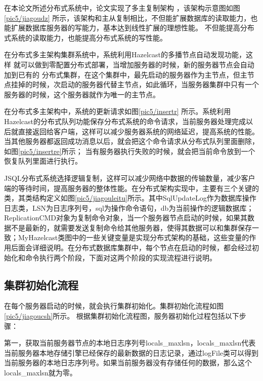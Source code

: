 在本论文所述分布式系统中，论文实现了多主复制架构
，该架构示意图如图\ref{pic5/jiagoudz}
所示，该架构和主从复制相比，不但能扩展数据库的读取能力，也能扩展数据库服务器的写能力，基本达到线性扩展的理想性能。
不但能提高分布式系统的读取能力，也能提高分布式系统的写性能。

在分布式多主架构集群系统中，系统利用Hazelcast的多播节点自动发现功能，这样
就可以做到零配置分布式部署，当增加服务器的时候，新的服务器节点会自动加到已有的
分布式集群，在这个集群中，最先启动的服务器作为主节点，但主节点挂掉的时候，次启动的服务器代替主节点，如此循环，当服务器集群中只有一个服务器的时候，这个服务器就作为唯一的主节点。

在分布式多主架构中，系统的更新请求如图\ref{pic5/insertr}
所示。系统利用Hazelcast的分布式队列功能保存分布式系统的命令请求，当前服务器处理完成以后就直接返回给客户端，这样可以减少服务器系统的网络延迟，提高系统的性能。当其他服务器都返回成功消息以后，就会把这个命令请求从分布式队列里面删除，如图\ref{pic5/insertre}所示；
当有服务器执行失败的时候，就会把当前命令放到一个恢复队列里面进行执行。

JSQL分布式系统选择逻辑复制，这样可以减少网络中数据的传输数量，减少客户端的等待时间，提高服务器的整体性能。在分布式架构实现中，主要有三个关键的类，其类结构定义如图\ref{pic5/jiagouleitu}所示。其中SqlUpdateLog作为数据库操作日志类，LSN为日志序列号，sql为操作命令语句，db为当前操作的逻辑数据库；ReplicationCMD对象为复制命令对象，当一个服务器节点启动的时候，如果其数据不是最新的，就需要发送复制命令给其他服务器，使得其数据可以和集群保存一致；MyHazelcast类图中的一些关键变量是实现分布式架构的基础，这些变量的作用后面会详细说明。在分布式数据库集群中，每个节点在启动的时候，都会经过初始化和命令执行两个阶段，下面对这两个阶段的实现流程进行说明。
\subsection{集群初始化流程}
在每个服务器启动的时候，就会执行集群初始化。集群初始化流程如图
\ref{pic5/jiagoucsh}所示。
根据集群初始化流程图，服务器初始化过程包括以下步骤：

第一，获取当前服务器节点的本地日志序列号locals\_maxlsn，locals\_maxlsn代表当前服务器本地存储引擎已经保存的最新数据的日志记录，通过logFile类可以得到当前服务器的本地日志序列号。如果当前服务器没有存储任何的数据，那么这个locals\_maxlsn就为零。

